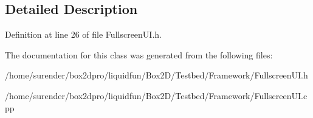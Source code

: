 \subsection{Detailed Description}


Definition at line 26 of file Fullscreen\-U\-I.\-h.



The documentation for this class was generated from the following files\-:\begin{DoxyCompactItemize}
\item 
/home/surender/box2dpro/liquidfun/\-Box2\-D/\-Testbed/\-Framework/Fullscreen\-U\-I.\-h\item 
/home/surender/box2dpro/liquidfun/\-Box2\-D/\-Testbed/\-Framework/Fullscreen\-U\-I.\-cpp\end{DoxyCompactItemize}
